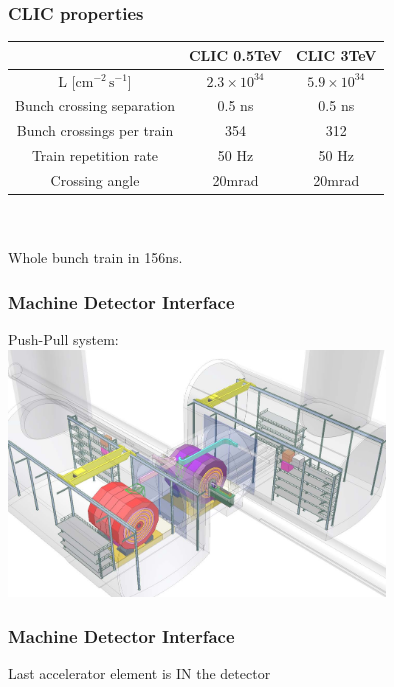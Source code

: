 \documentclass{beamer}
\begin{document}
\begin{frame}
\frametitle{CLIC properties}
\begin{center}
\begin{tabular}{ccc}
 & CLIC 0.5TeV & CLIC 3TeV\\
 \midrule
L [$\textrm{cm}^{-2}\,\textrm{s}^{-1}$] & $2.3\times 10^{34}$&$5.9\times
10^{34}$
\\
\midrule
Bunch crossing separation  & 0.5 ns & \alert{0.5 ns}\\
\midrule
Bunch crossings per train & 354 & \alert{312}\\
\midrule
Train repetition rate  & 50 Hz & 50 Hz\\
\midrule
Crossing angle & 20mrad & 20mrad\\
\bottomrule
\end{tabular}\\
~\\
\alert{Whole bunch train in 156ns.}
\end{center}
\end{frame}
\begin{frame}
\frametitle{Machine Detector Interface}
Push-Pull system:\\
\includegraphics[width=10cm]{PushPull.png}
\end{frame}
\begin{frame}
\frametitle{Machine Detector Interface}
\begin{center}
\alert{Last accelerator element is IN the detector}
\end{center}
\end{frame}
\end{document}
